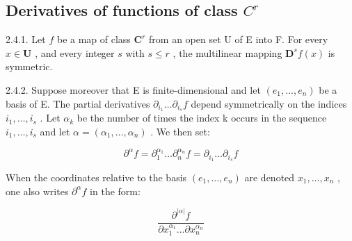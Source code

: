 \subsection{\texorpdfstring{Derivatives of functions of class \(C^{r}\)}{Derivatives of functions of class C\^{}\{r\}}}

2.4.1. Let \(f\) be a map of class \(\mathbf{C}^{r}\) from an open set U of E into F. For every \(x \in \mathbf{U}\) , and every integer \(s\) with \(s \leqslant r\) , the multilinear mapping \(\mathbf{D}^{s}f(x)\) is symmetric.

2.4.2. Suppose moreover that E is finite-dimensional and let \((e_{1},\ldots,e_{n})\) be a basis of E. The partial derivatives \(\partial_{i_{1}}\ldots\partial_{i_{s}}f\) depend symmetrically on the indices \(i_{1},\ldots,i_{s}\) . Let \(\alpha_{k}\) be the number of times the index k occurs in the sequence \(i_{1},\ldots,i_{s}\) and let \(\alpha=(\alpha_{1},\ldots,\alpha_{n})\) . We then set:

\[
\partial^ {\alpha} f = \partial_ {1} ^ {\alpha_ {1}} \dots \partial_ {n} ^ {\alpha_ {n}} f = \partial_ {i _ {1}} \dots \partial_ {i _ {s}} f
\]

When the coordinates relative to the basis \((e_{1},\ldots,e_{n})\) are denoted \(x_{1},\ldots,x_{n}\) , one also writes \(\partial^{\alpha}f\) in the form:

\[
\frac {\partial^ {| \alpha |} f}{\partial x _ {1} ^ {\alpha_ {1}} \dots \partial x _ {n} ^ {\alpha_ {n}}}
\]

